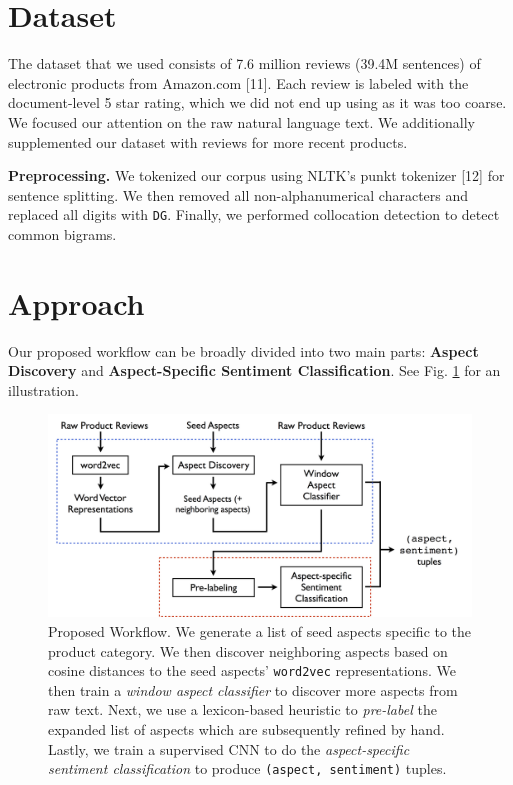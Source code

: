 \documentclass{article} %
\begin{document}

\section{Dataset}
The dataset that we used consists of 7.6 million reviews (39.4M sentences) of electronic products from Amazon.com [11]. Each review is labeled with the document-level 5 star rating, which we did not end up using as it was too coarse. We focused our attention on the raw natural language text. We additionally supplemented our dataset with reviews for more recent products.

\textbf{Preprocessing.} We tokenized our corpus using NLTK's punkt tokenizer [12] for sentence splitting. We then removed all non-alphanumerical characters and replaced all digits with \texttt{DG}. Finally, we performed collocation detection to detect common bigrams.

\section{Approach}

Our proposed workflow can be broadly divided into two main parts: {\bf Aspect Discovery} and {\bf Aspect-Specific Sentiment Classification}. See Fig. \ref{workflow} for an illustration.

\begin{figure}[ht]
\begin{center}
\includegraphics[width=.85\columnwidth]{workflow.png}
\end{center}
\caption{Proposed Workflow. We generate a list of seed aspects specific to the product category. We then discover neighboring aspects based on cosine distances to the seed aspects' \texttt{word2vec} representations. We then train a \textit{window aspect classifier} to discover more aspects from raw text. Next, we use a lexicon-based heuristic to \textit{pre-label} the expanded list of aspects which are subsequently refined by hand. Lastly, we train a supervised CNN to do the \textit{aspect-specific sentiment classification} to produce \texttt{(aspect, sentiment)} tuples.}
\label{workflow}
\end{figure}
\end{document}
